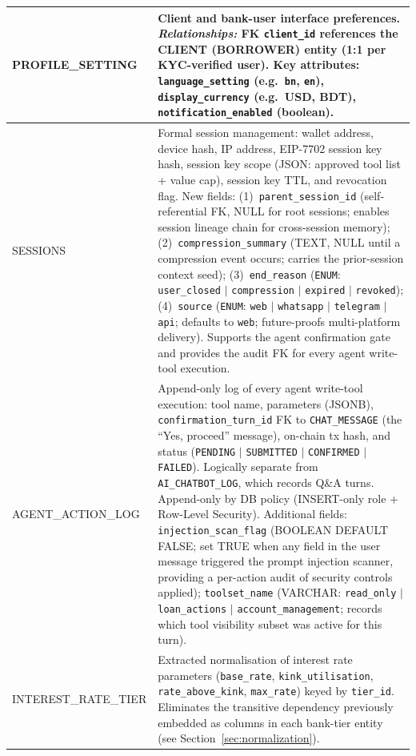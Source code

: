 \documentclass[12pt,a4paper]{report}
\begin{document}
\begin{table}[H]
\begin{tabular}{p{4cm}p{9.5cm}}
PROFILE\_SETTING & Client and bank-user interface preferences. \textit{Relationships:} FK \texttt{client\_id} references the CLIENT (BORROWER) entity (1:1 per KYC-verified user). Key attributes: \texttt{language\_setting} (e.g.\ \texttt{bn}, \texttt{en}), \texttt{display\_currency} (e.g.\ USD, BDT), \texttt{notification\_enabled} (boolean). \\
\hline
SESSIONS & Formal session management: wallet address, device hash, IP address,
EIP-7702 session key hash, session key scope (JSON: approved tool list + value cap),
session key TTL, and revocation flag. New fields: (1)~\texttt{parent\_session\_id}
(self-referential FK, NULL for root sessions; enables session lineage chain for
cross-session memory); (2)~\texttt{compression\_summary} (TEXT, NULL until a
compression event occurs; carries the prior-session context seed); (3)~\texttt{end\_reason}
(\texttt{ENUM}: \texttt{user\_closed} $|$ \texttt{compression} $|$ \texttt{expired}
$|$ \texttt{revoked}); (4)~\texttt{source} (\texttt{ENUM}: \texttt{web}
$|$ \texttt{whatsapp} $|$ \texttt{telegram} $|$ \texttt{api}; defaults to
\texttt{web}; future-proofs multi-platform delivery). Supports the agent
confirmation gate and provides the audit FK for every agent write-tool execution. \\
\hline
AGENT\_ACTION\_LOG & Append-only log of every agent write-tool execution: tool name, parameters (JSONB), \texttt{confirmation\_turn\_id} FK to \texttt{CHAT\_MESSAGE} (the ``Yes, proceed'' message), on-chain tx hash, and status (\texttt{PENDING} $|$ \texttt{SUBMITTED} $|$ \texttt{CONFIRMED} $|$ \texttt{FAILED}). Logically separate from \texttt{AI\_CHATBOT\_LOG}, which records Q\&A turns. Append-only by DB policy (INSERT-only role + Row-Level Security). Additional fields: \texttt{injection\_scan\_flag} (BOOLEAN DEFAULT FALSE; set TRUE when any field in the user message triggered the prompt injection scanner, providing a per-action audit of security controls applied); \texttt{toolset\_name} (VARCHAR: \texttt{read\_only} $|$ \texttt{loan\_actions} $|$ \texttt{account\_management}; records which tool visibility subset was active for this turn). \\
\hline
INTEREST\_RATE\_TIER & Extracted normalisation of interest rate parameters (\texttt{base\_rate}, \texttt{kink\_utilisation}, \texttt{rate\_above\_kink}, \texttt{max\_rate}) keyed by \texttt{tier\_id}. Eliminates the transitive dependency previously embedded as columns in each bank-tier entity (see Section~\ref{sec:normalization}). \\

\end{tabular}
\end{table}
\end{document}
